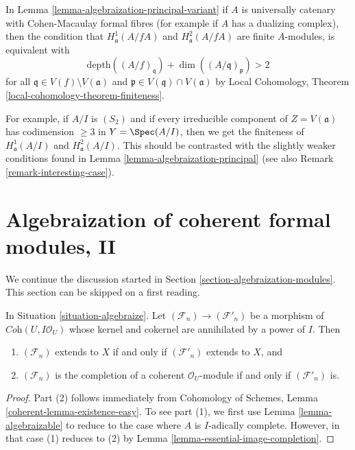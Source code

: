 \begin{remark}
\label{remark-interesting-case-variant}
In Lemma \ref{lemma-algebraization-principal-variant}
if $A$ is universally catenary with Cohen-Macaulay
formal fibres (for example if $A$ has a dualizing complex), then
the condition that
$H^1_\mathfrak a(A/fA)$ and $H^2_\mathfrak a(A/fA)$
are finite $A$-modules, is equivalent with
$$
\text{depth}((A/f)_\mathfrak q) + \dim((A/\mathfrak q)_\mathfrak p) > 2
$$
for all $\mathfrak q \in V(f) \setminus V(\mathfrak a)$
and $\mathfrak p \in V(\mathfrak q) \cap V(\mathfrak a)$
by Local Cohomology, Theorem \ref{local-cohomology-theorem-finiteness}.

\medskip\noindent
For example, if $A/I$ is $(S_2)$ and if every irreducible
component of $Z = V(\mathfrak a)$ has codimension $\geq 3$
in $Y = \Spec(A/I)$, then we get the finiteness of
$H^1_\mathfrak a(A/I)$ and $H^2_\mathfrak a(A/I)$.
This should be contrasted with the slightly weaker conditions
found in Lemma \ref{lemma-algebraization-principal}
(see also Remark \ref{remark-interesting-case}).
\end{remark}






\section{Algebraization of coherent formal modules, II}
\label{section-algebraization-modules-general}

\noindent
We continue the discussion started in
Section \ref{section-algebraization-modules}.
This section can be skipped on a first reading.

\begin{lemma}
\label{lemma-map-kernel-cokernel-on-closed}
In Situation \ref{situation-algebraize}. Let
$(\mathcal{F}_n) \to (\mathcal{F}'_n)$ be a morphism of
$\textit{Coh}(U, I\mathcal{O}_U)$
whose kernel and cokernel are annihilated by a power of $I$. Then
\begin{enumerate}
\item $(\mathcal{F}_n)$ extends to $X$ if and only if
$(\mathcal{F}'_n)$ extends to $X$, and
\item $(\mathcal{F}_n)$ is the completion of a coherent $\mathcal{O}_U$-module
if and only if $(\mathcal{F}'_n)$ is.
\end{enumerate}
\end{lemma}

\begin{proof}
Part (2) follows immediately from
Cohomology of Schemes, Lemma \ref{coherent-lemma-existence-easy}.
To see part (1), we first use Lemma \ref{lemma-algebraizable}
to reduce to the case where $A$ is $I$-adically complete.
However, in that case (1) reduces to (2) by
Lemma \ref{lemma-essential-image-completion}.
\end{proof}

